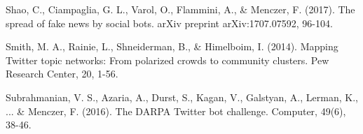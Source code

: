 \begin{thebibliography}{1}
 Shao, C., Ciampaglia, G. L., Varol, O., Flammini, A., \& Menczer, F. (2017). The spread of fake news by social bots. arXiv preprint arXiv:1707.07592, 96-104.

 Smith, M. A., Rainie, L., Shneiderman, B., \& Himelboim, I. (2014). Mapping Twitter topic networks: From polarized crowds to community clusters. Pew Research Center, 20, 1-56.

 Subrahmanian, V. S., Azaria, A., Durst, S., Kagan, V., Galstyan, A., Lerman, K., ... \& Menczer, F. (2016). The DARPA Twitter bot challenge. Computer, 49(6), 38-46.

\end{thebibliography}